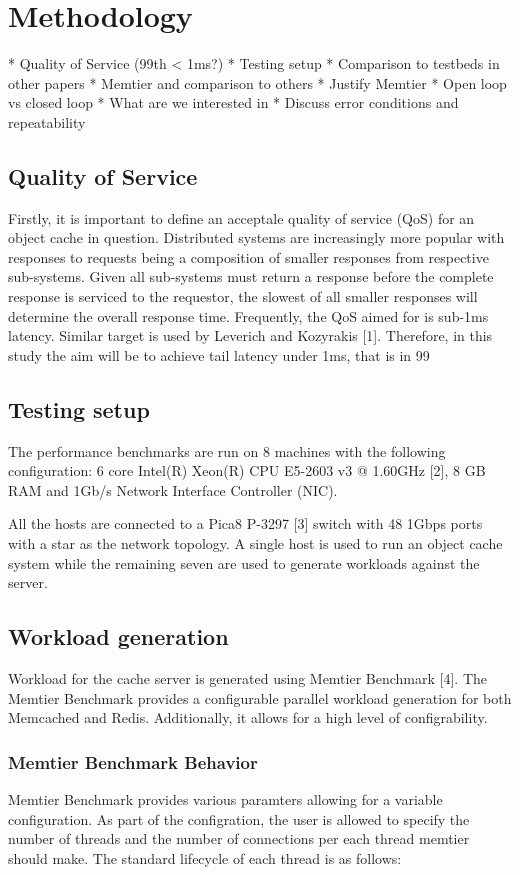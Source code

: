 \section{Methodology}

* Quality of Service (99th < 1ms?)
* Testing setup
* Comparison to testbeds in other papers
* Memtier and comparison to others
* Justify Memtier
* Open loop vs closed loop
* What are we interested in
* Discuss error conditions and repeatability

\subsection{Quality of Service}
Firstly, it is important to define an acceptale quality of service (QoS) for an object cache in question. Distributed systems are increasingly more popular with responses to requests being a composition of smaller responses from respective sub-systems. Given all sub-systems must return a response before the complete response is serviced to the requestor, the slowest of all smaller responses will determine the overall response time. Frequently, the QoS aimed for is sub-1ms latency. Similar target is used by Leverich and Kozyrakis [1]. Therefore, in this study the aim will be to achieve tail latency under 1ms, that is in 99%

\subsection{Testing setup}
The performance benchmarks are run on 8 machines with the following configuration: 6 core Intel(R) Xeon(R) CPU E5-2603 v3 @ 1.60GHz [2], 8 GB RAM and 1Gb/s Network Interface Controller (NIC).

All the hosts are connected to a Pica8 P-3297 [3] switch with 48 1Gbps ports with a star as the network topology. A single host is used to run an object cache system while the remaining seven are used to generate workloads against the server.

\subsection{Workload generation}
Workload for the cache server is generated using Memtier Benchmark [4]. The Memtier Benchmark provides a configurable parallel workload generation for both Memcached and Redis. Additionally, it allows for a high level of configrability.

\subsubsection{Memtier Benchmark Behavior}
Memtier Benchmark provides various paramters allowing for a variable configuration. As part of the configration, the user is allowed to specify the number of threads and the number of connections per each thread memtier should make. The standard lifecycle of each thread is as follows:

